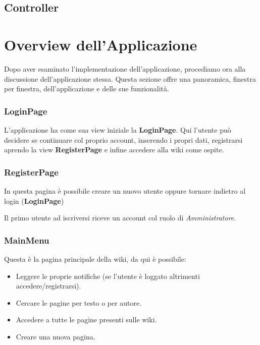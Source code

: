 \documentclass{article}
\begin{document}
{		\subsection{Controller}
		
		\newpage
		
		\section{Overview dell'Applicazione}
		Dopo aver esaminato l'implementazione dell'applicazione, procediamo ora alla discussione dell'applicazione stessa. Questa sezione offre una panoramica, finestra per finestra, dell'applicazione e delle sue funzionalità.
		
		\subsubsection{LoginPage}
		
		L'applicazione ha come sua view iniziale la \textbf{LoginPage}. Qui l'utente pu\`o decidere se continuare col proprio account, inserendo i propri dati, registrarsi aprendo la view \textbf{RegisterPage} e infine accedere alla wiki come ospite.
		
		\subsubsection{RegisterPage}
		
		In questa pagina \`e possibile creare un nuovo utente oppure tornare indietro al login (\textbf{LoginPage})
		
		Il primo utente ad iscriversi riceve un account col ruolo di {\itshape {Amministratore}}.
		
		
		\subsubsection{MainMenu}
		
		Questa \`e la pagina principale della wiki, da qui \`e possibile:
		
		\begin{itemize}
			\item Leggere le proprie notifiche (se l'utente \`e loggato altrimenti accedere/registrarsi).
			\item Cercare le pagine per testo o per autore.
			\item Accedere a tutte le pagine presenti sulle wiki.
			\item Creare una nuova pagina.
		\end{itemize}
		
}
\end{document}
